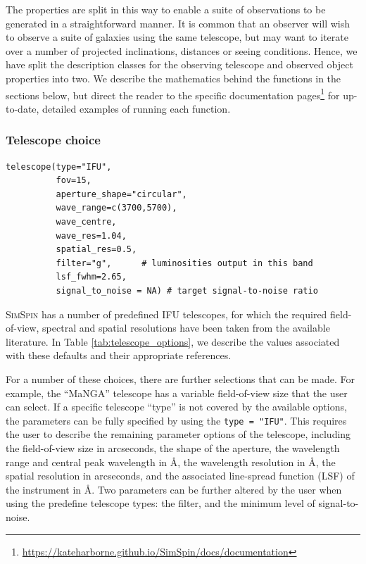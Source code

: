 \documentclass[
  journal=pasa,
  manuscript=research-paper, %
  year=2020,
  volume=37,
]{cup-journal}
\newcommand{\simspin}[1]{\textsc{SimSpin}#1} %
\begin{document}
The properties are split in this way to enable a suite of observations to be generated in a straightforward manner. 
It is common that an observer will wish to observe a suite of galaxies using the same telescope, but may want to iterate over a number of projected inclinations, distances or seeing conditions. 
Hence, we have split the description classes for the observing telescope and observed object properties into two. 
We describe the mathematics behind the functions in the sections below, but direct the reader to the specific documentation pages\footnote{\url{https://kateharborne.github.io/SimSpin/docs/documentation}} for up-to-date, detailed examples of running each function.

\subsubsection{Telescope choice}

\begin{lstlisting}[basicstyle=\fontsize{6}{8}\selectfont\ttfamily]
telescope(type="IFU",  
          fov=15,                             
          aperture_shape="circular", 
          wave_range=c(3700,5700),   
          wave_centre,              
          wave_res=1.04,    
          spatial_res=0.5, 
          filter="g",      # luminosities output in this band  
          lsf_fwhm=2.65,
          signal_to_noise = NA) # target signal-to-noise ratio

\end{lstlisting}

\simspin{} has a number of predefined IFU telescopes, for which the required field-of-view, spectral and spatial resolutions have been taken from the available literature. 
In Table \ref{tab:telescope_options}, we describe the values associated with these defaults and their appropriate references. 

For a number of these choices, there are further selections that can be made. 
For example, the ``MaNGA'' telescope has a variable field-of-view size that the user can select.
If a specific telescope ``type'' is not covered by the available options, the parameters can be fully specified by using the \texttt{type = "IFU"}. 
This requires the user to describe the remaining parameter options of the telescope, including the field-of-view size in arcseconds, the shape of the aperture, the wavelength range and central peak wavelength in \AA, the wavelength resolution in \AA, the spatial resolution in arcseconds, and the associated line-spread function (LSF) of the instrument in \AA.
Two parameters can be further altered by the user when using the predefine telescope types: the filter, and the minimum level of signal-to-noise. 
\end{document}

